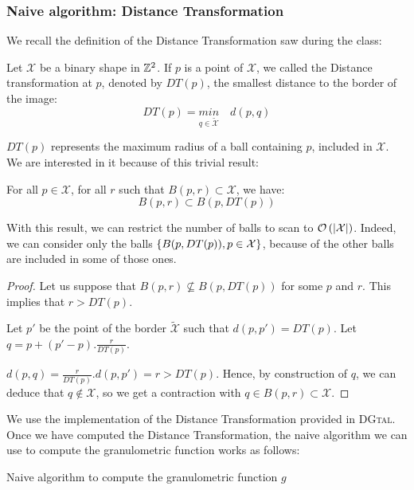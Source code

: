 \subsubsection{Naive algorithm: Distance Transformation}

We recall the definition of the Distance Transformation saw during the class:

\begin{definition}
Let $\mathcal{X}$ be a binary shape in $\mathbb{Z}^{2}$. If $p$ is a point of $\mathcal{X}$, we called the Distance transformation at $p$, denoted by $DT(p)$, the smallest distance to the border of the image:
$$ DT(p) = \underset{q \in \widetilde{\mathcal{X}}}{min} \quad d(p,q) $$
\end{definition}

$DT(p)$ represents the maximum radius of a ball containing $p$, included in $\mathcal{X}$. We are interested in it because of this trivial result:

\begin{theoreme}
	For all $p \in \mathcal{X}$, for all $r$ such that $B(p,r) \subset \mathcal{X}$, we have:
		$$ B(p,r) \subset B(p,DT(p))$$
\label{theoremDT}
\end{theoreme}

With this result, we can restrict the number of balls to scan to $\mathcal O \left( \left| \mathcal{X} \right| \right)$. Indeed, we can consider only the balls $\left\{ B(p,DT(p)), p \in \mathcal{X} \right\}$, because of the other balls are included in some of those ones.

\begin{proof}
	
Let us suppose that $B(p,r) \nsubseteq B(p,DT(p))$ for some $p$ and $r$. This implies that $r > DT(p)$.

Let $p'$ be the point of the border $\widetilde{\mathcal{X}}$ such that $d(p,p') = DT(p)$. Let $q = p + (p'-p).\frac{r}{DT(p)}.$ 

$d(p,q) = \frac{r}{DT(p)}.d(p,p') = r > DT(p)$. Hence, by construction of $q$, we can deduce that $q \notin \mathcal{X}$, so we get a contraction with $q \in B(p,r) \subset \mathcal{X}$. 

\end{proof}

We use the implementation of the Distance Transformation provided in \textsc{DGtal}. Once we have computed the Distance Transformation, the naive algorithm we can use to compute the granulometric function works as follows:

\IncMargin{1em}
\begin{algorithm}
\caption{Naive algorithm to compute the granulometric function $g$}
\label{algo-naive}
\end{algorithm}

